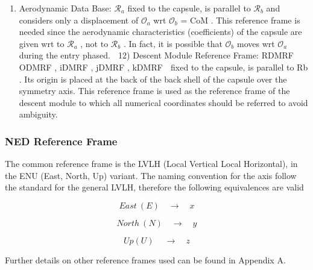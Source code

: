   \begin{enumerate}
      \item Aerodynamic Data Base: $\mathcal{R}_{a}$ fixed to the capsule, is parallel to $\mathcal{R}_b$ and considers
         only a displacement of $\mathcal{O}_a$ wrt $\mathcal{O}_b$ = CoM . This reference frame is needed since the aerodynamic
         characteristics (coefficients) of the capsule are given wrt to $\mathcal{R}_a$ , not to $\mathcal{R}_b$ . In fact, it is possible that
         $\mathcal{O}_b$ moves wrt $\mathcal{O}_a$ during the entry phased.
      
      12) Descent Module Reference Frame: RDMRF  ODMRF , iDMRF , jDMRF , kDMRF
       fixed to the capsule, is
      parallel to Rb . Its origin is placed at the back of the back shell of the capsule over the symmetry
      axis. This reference frame is used as the reference frame of the descent module to which all
      numerical coordinates should be referred to avoid ambiguity.
   \end{enumerate}

   


\newpage
\subsubsection{NED Reference Frame}

   The common reference frame is the LVLH (Local Vertical Local Horizontal), in the ENU (East, North, Up) variant.
   The naming convention for the axis follow the standard for the general LVLH, therefore the following equivalences are valid

   $$
      East\: (E) \quad\to\quad x
   $$

   $$
      North\: (N) \quad\to\quad y
   $$

   $$
      Up (U)\: \quad\to\quad z
   $$

Further details on other reference frames used can be found in Appendix A.